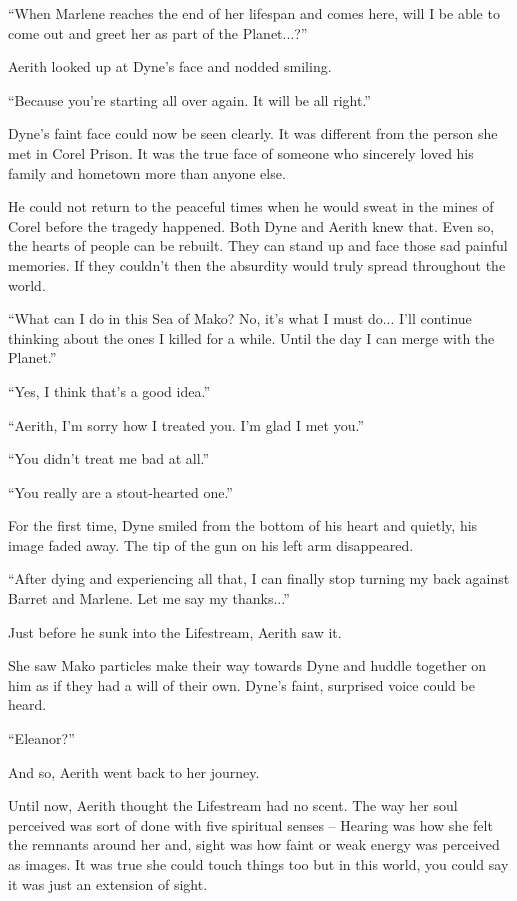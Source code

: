 \documentclass[oneside]{book}
\begin{document}
“When Marlene reaches the end of her lifespan and comes here, will I be able to come out and greet her as part of the Planet...?”

Aerith looked up at Dyne's face and nodded smiling.

“Because you're starting all over again. It will be all right.”

Dyne's faint face could now be seen clearly. It was different from the person she met in Corel Prison. It was the true face of someone who sincerely loved his family and hometown more than anyone else.

He could not return to the peaceful times when he would sweat in the mines of Corel before the tragedy happened. Both Dyne and Aerith knew that. Even so, the hearts of people can be rebuilt. They can stand up and face those sad painful memories. If they couldn't then the absurdity would truly spread throughout the world.

“What can I do in this Sea of Mako? No, it's what I must do... I'll continue thinking about the ones I killed for a while. Until the day I can merge with the Planet.”

“Yes, I think that's a good idea.”

“Aerith, I'm sorry how I treated you. I'm glad I met you.”

“You didn't treat me bad at all.”

“You really are a stout-hearted one.”

For the first time, Dyne smiled from the bottom of his heart and quietly, his image faded away. The tip of the gun on his left arm disappeared.

“After dying and experiencing all that, I can finally stop turning my back against Barret and Marlene. Let me say my thanks...”

Just before he sunk into the Lifestream, Aerith saw it.

She saw Mako particles make their way towards Dyne and huddle together on him as if they had a will of their own. Dyne's faint, surprised voice could be heard.

“Eleanor?”

And so, Aerith went back to her journey.

\newpage
Until now, Aerith thought the Lifestream had no scent. The way her soul perceived was sort of done with five spiritual senses – Hearing was how she felt the remnants around her and, sight was how faint or weak energy was perceived as images. It was true she could touch things too but in this world, you could say it was just an extension of sight.
\end{document}

